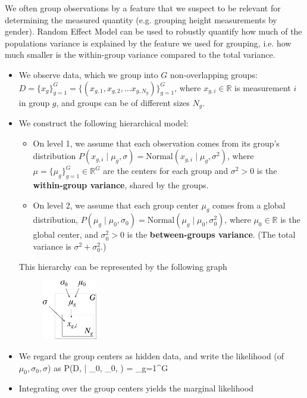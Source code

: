 We often group observations by a feature that we suspect to be relevant for determining the measured quantity (e.g. grouping height measurements by gender). Random Effect Model can be used to robustly quantify how much of the populations variance is explained by the feature we used for grouping, i.e. how much smaller is the within-group variance compared to the total variance.
\begin{itemize}
	\item We observe data, which we group into $G$ non-overlapping groups: $D = \{x_g\}_{g=1}^G = \{(x_{g,1}, x_{g,2},\ldots x_{g, N_g})\}_{g=1}^G$, where $x_{g,i} \in \mathds{R}$ is measurement $i$ in group $g$, and groups can be of different sizes $N_g$.
	\item We construct the following hierarchical model:
	\begin{itemize}
		\item On level 1, we assume that each observation comes from its group's distribution $P(x_{g,i}\;|\;\mu_g, \sigma) = \text{Normal}(x_{g,i}\;|\;\mu_g, \sigma^2)$, where $\mu = \{\mu_g\}_{g=1}^G \in \mathds{R}^G$ are the centers for each group and $\sigma^2 > 0$ is the {\bf within-group variance}, shared by the groups.
		\item On level 2, we assume that each group center $\mu_g$ comes from a global distribution, $P(\mu_g\;|\;\mu_0,\sigma_0) = \text{Normal}(\mu_g\;|\;\mu_0, \sigma_0^2)$, where $\mu_0 \in \mathds{R}$ is the global center, and $\sigma_0^2 > 0$ is the {\bf between-groups variance}. (The total variance is $\sigma^2 + \sigma_0^2$.)
	\end{itemize}
	This hierarchy can be represented by the following graph
	\begin{figure}[h]
		\centering
			\includegraphics[height=26mm]{./figs/04-anova.pdf}
	\end{figure}
	\item We regard the group centers as hidden data, and write the likelihood (of $\mu_0, \sigma_0, \sigma$) as
	\be
		P(D, \mu\;|\; \mu_0, \sigma_0, \sigma) = \prod_{g=1}^G\left[\text{Normal}(\mu_g\;|\;\mu_0, \sigma_0^2) \times \prod_{i=1}^{N_g}\text{Normal}(x_{g,i}\;|\;\mu_g, \sigma^2)\right]
	\ee
	\item Integrating over the group centers yields the marginal likelihood

\end{itemize}
